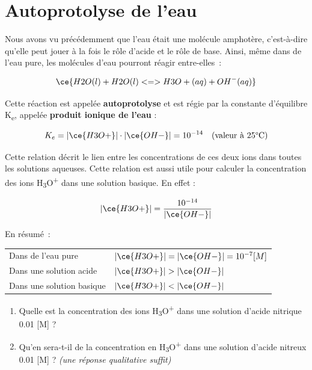 \documentclass[
  11pt,
  a4paper,
  openany]{book}
\providecommand{\tightlist}{%
  \setlength{\itemsep}{0pt}\setlength{\parskip}{0pt}}
\begin{document}
\clearpage

\section{Autoprotolyse de l'eau}\label{autoprotolyse-de-leau}

Nous avons vu précédemment que l'eau était une molécule amphotère, c'est-à-dire qu'elle peut jouer à la fois le rôle d'acide et le rôle de base. Ainsi, même dans de l'eau pure, les molécules d'eau pourront réagir entre-elles~:

\[
\ce{H2O(l) + H2O(l) <=> H3O+(aq) + OH^{-}(aq)}
\]

Cette réaction est appelée \textbf{autoprotolyse} et est régie par la constante d'équilibre K\textsubscript{e}, appelée \textbf{produit ionique de l'eau} :

\[
K_e = |\ce{H3O+}| \cdot |\ce{OH-}| = 10^{-14} \quad \text{(valeur à 25°C)}
\]

Cette relation décrit le lien entre les concentrations de ces deux ions dans toutes les solutions aqueuses. Cette relation est aussi utile pour calculer la concentration des ions H\textsubscript{3}O\textsuperscript{+} dans une solution basique. En effet :

\[
|\ce{H3O+}| = \frac{10^{-14}}{|\ce{OH-}|}
\]

En résumé~:

\begin{longtable}[]{@{}
  >{\raggedright\arraybackslash}p{}
  >{\centering\arraybackslash}p{}@{}}
\toprule\noalign{}
\endhead
\bottomrule\noalign{}
\endlastfoot
Dans de l'eau pure & \(|\ce{H3O+}| = |\ce{OH-}| = 10^{-7} [M]\) \\
Dans une solution acide & \(|\ce{H3O+}| > |\ce{OH-}|\) \\
Dans une solution basique & \(|\ce{H3O+}| < |\ce{OH-}|\) \\
\end{longtable}

\begin{Exercise}

\begin{enumerate}
\def\labelenumi{\alph{enumi}.}
\tightlist
\item
  Quelle est la concentration des ions H\textsubscript{3}O\textsuperscript{+} dans une solution d'acide nitrique 0.01 {[}M{]} ?
\item
  Qu'en sera-t-il de la concentration en H\textsubscript{3}O\textsuperscript{+} dans une solution d'acide nitreux 0.01 {[}M{]} ?
  \emph{(une réponse qualitative suffit)}
\end{enumerate}

\end{Exercise}
\end{document}
